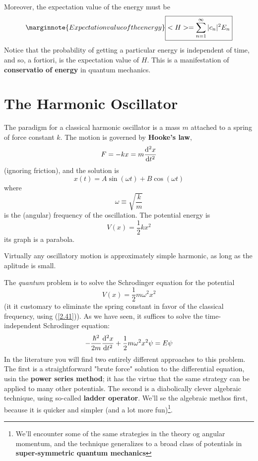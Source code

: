 Moreover, the expectation value of the energy must be
\begin{equation}\label{2.39}\marginnote{Expectation value of the energy}
	\boxed{<H>=\sum_{n=1}^\infty |c_n|^2E_n}
\end{equation}
Notice that the probability of getting a particular energy is independent of time, and so, a fortiori, is the expectation value of $H$. This is a manifestation of \textbf{conservatio of energy} in quantum mechanics.

\section{The Harmonic Oscillator}
The paradigm for a classical harmonic oscillator is a mass $m$ attached to a spring of force constant $k$. The motion is governed by \textbf{Hooke's law}, $$F=-kx=m\dv[2]{x}{t}$$ (ignoring friction), and the solution is
$$x(t)=A\sin(\omega t)+B\cos(\omega t)$$ where
\begin{equation}\label{2.41}
	\omega \equiv\sqrt{\frac{k}{m}}
\end{equation}
is the (angular) frequency of the oscillation. The potential energy is
\begin{equation}\label{2.42}
	V(x)=\frac{1}{2}kx^2
\end{equation}
its graph is a parabola.

Virtually any oscillatory motion is approximately simple harmonic, as long as the aplitude is small.

The \textit{quantum} problem is to solve the Schrodinger equation for the potential
\begin{equation}\label{2.43}
	V(x)=\frac{1}{2}m\omega^2x^2
\end{equation}
(it it customary to eliminate the spring constant in favor of the classical frequency, using (\ref{2.41})). As we have seen, it suffices to solve the time-independent Schrodinger equation:
\begin{equation}\label{2.44}
	-\frac{\hbar^2}{2m}\dv[2]{x}{t}+\frac{1}{2}m\omega^2x^2\psi=E\psi
\end{equation}
In the literature you will find two entirely different approaches to this problem. The first is a straightforward "brute force" solution to the differential equation, usin the \textbf{power series method}; it has the virtue that the same strategy can be applied to many other potentials. The second is a diabolically clever algebraic technique, using so-called \textbf{ladder operator}. We'll se the algebraic methos first, because it is quicker and simpler (and a lot more fun)\footnote{We'll encounter some of the same strategies in the theory og angular momentum, and the technique generalizes to a broad class of potentials in \textbf{super-symmetric quantum mechanics}}. 

